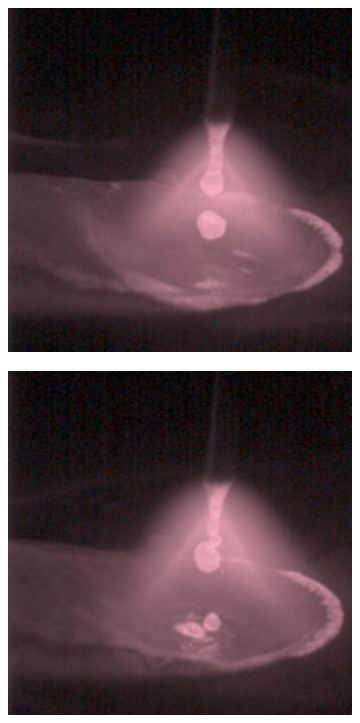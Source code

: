 \begin{figure}[htbp]
    \centering
    \begin{subfigure}[b]{0.3\textwidth}
        \includegraphics[width=\linewidth]{Images/Dataset/spray_sample_0.jpg}
        \caption{}
    \end{subfigure}
\hfill
    \begin{subfigure}[b]{0.3\textwidth}
        \includegraphics[width=\linewidth]{Images/Dataset/spray_sample_77.jpg}

\end{subfigure}
\end{figure}
